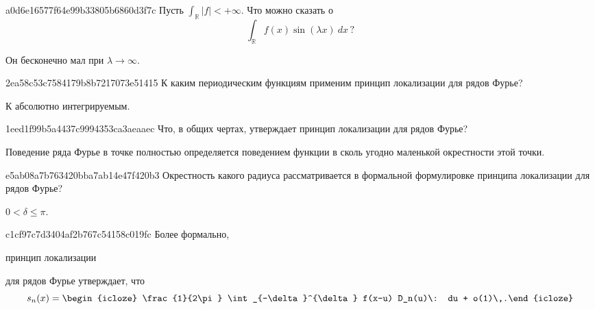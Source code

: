 \begin{note}{a0d6e16577f64e99b33805b6860d3f7c}
    Пусть \({ \int_{\mathbb R} \left\lvert f \right\rvert < +\infty }\).
    Что можно сказать о
    \[
        \int_{\mathbb R} f(x) \sin (\lambda x)\: dx\,?
    \]

    \begin{cloze}{1}
        Он бесконечно мал при \({ \lambda \to \infty }\).
    \end{cloze}
\end{note}

\begin{note}{2ea58c53c7584179b8b7217073e51415}
    К каким периодическим функциям применим принцип локализации для рядов Фурье?

    \begin{cloze}{1}
        К абсолютно интегрируемым.
    \end{cloze}
\end{note}

\begin{note}{1eed1f99b5a4437c9994353ca3aeaaec}
    Что, в общих чертах, утверждает принцип локализации для рядов Фурье?

    \begin{cloze}{1}
        Поведение ряда Фурье в точке полностью определяется поведением функции в сколь угодно маленькой окрестности этой точки.
    \end{cloze}
\end{note}

\begin{note}{e5ab08a7b763420bba7ab14e47f420b3}
    Окрестность какого радиуса рассматривается в формальной формулировке принципа локализации для рядов Фурье?

    \begin{cloze}{1}
        \({ 0 < \delta \leqslant \pi }\).
    \end{cloze}
\end{note}

\begin{note}{c1cf97c7d3404af2b767c54158c019fc}
    Более формально, \begin{icloze}{2}принцип локализации\end{icloze} для рядов Фурье утверждает, что
    \[
        s_n(x) = \begin{icloze}{1}\frac{1}{2\pi} \int_{-\delta}^{\delta} f(x-u) D_n(u)\: du + o(1)\,.\end{icloze}
    \]
\end{note}


